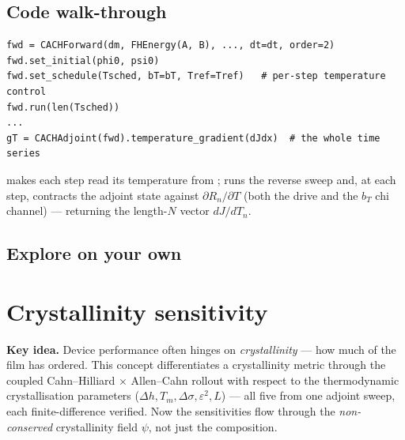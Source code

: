 \section{Code walk-through}

\begin{lstlisting}
fwd = CACHForward(dm, FHEnergy(A, B), ..., dt=dt, order=2)
fwd.set_initial(phi0, psi0)
fwd.set_schedule(Tsched, bT=bT, Tref=Tref)   # per-step temperature control
fwd.run(len(Tsched))
...
gT = CACHAdjoint(fwd).temperature_gradient(dJdx)  # the whole time series
\end{lstlisting}
 makes each step read its temperature from
;  runs the reverse sweep and,
at each step, contracts the adjoint state against $\partial R_n/\partial
T$ (both the drive and the $b_T$ chi channel) --- returning the length-$N$
vector $dJ/dT_n$.

\section{Explore on your own}



\chapter{Crystallinity sensitivity}
\label{ch:d5}

\begin{keybox}
\textbf{Key idea.} Device performance often hinges on \emph{crystallinity}
--- how much of the film has ordered. This concept differentiates a
crystallinity metric through the coupled Cahn--Hilliard $\times$
Allen--Cahn rollout with respect to the thermodynamic crystallisation
parameters ($\Delta h,T_m,\Delta\sigma,\varepsilon^2,L$) --- all five from
one adjoint sweep, each finite-difference verified. Now the sensitivities
flow through the \emph{non-conserved} crystallinity field $\psi$, not just
the composition.
\end{keybox}

